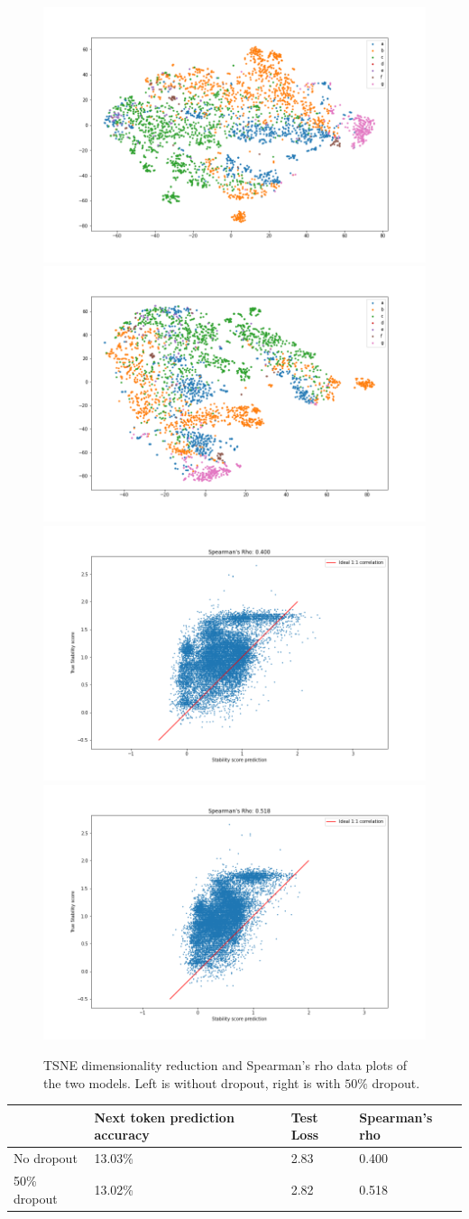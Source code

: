 \begin{figure}[!ht]
  \centering
  \includegraphics[width=0.49\linewidth]{latex/imgs/tsne_2_layer_no_drop_final.png}
  \includegraphics[width=0.49\linewidth]{latex/imgs/tsne_2_layer_05_drop_final.png}
  \includegraphics[width=0.49\linewidth]{latex/imgs/spearman_2_layer_no_drop_final.png}
  \includegraphics[width=0.49\linewidth]{latex/imgs/spearman_2_layer_05_drop_final.png}
  \caption{TSNE dimensionality reduction  and Spearman's rho data plots of the two models. Left is without dropout, right is with $50\%$ dropout.}
  \label{fig:cluster_spearman}
\end{figure}

\begin{table}[!ht]
\begin{tabular}{|l|l|l|l|}
\hline
             & Next token prediction accuracy & Test Loss & Spearman's rho\\ \hline
No dropout   & 13.03\%                        & 2.83      & 0.400         \\ \hline
50\% dropout & 13.02\%                        & 2.82      & 0.518         \\ \hline
\end{tabular}
\end{table}